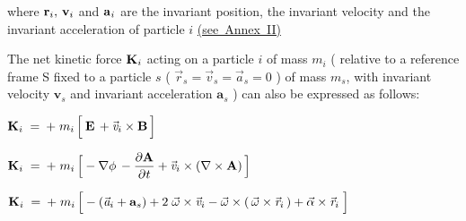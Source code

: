 \documentclass[10pt]{article}
\begin{document}
\vspace{+0.09em}

\par \bigskip \noindent where ${\mathbf{r}}_i, \hspace{+0.180em} {\mathbf{v}}_i$ and ${\mathbf{a}}_{\hspace{+0.045em}i}$ are the invariant position, the invariant velocity and the invariant \hbox {acceleration} of particle $i$ \hbox {\hyperlink{a1p2}{(\hspace{+0.09em}see Annex II\hspace{+0.120em})}}

\newpage

\par {}

\par {}

\par \bigskip \noindent The net kinetic force ${\mathbf{K}}_{\hspace{+0.009em}i}$ acting on a particle $i$ of mass $m_i$ ( relative to a reference frame S fixed to a particle $s$ ( ${\vec{\mathit{r}}}_{s} = {\vec{\mathit{v}}}_{s} = {\vec{\mathit{a}}}_{s} = 0$ ) of mass $m_s$, with invariant velocity ${\mathbf{v}}_s$ and invariant acceleration ${\mathbf{a}}_s$ ) can also be expressed as follows:

\par \bigskip ${\mathbf{K}}_{\hspace{+0.009em}i} \;=\: + \; m_i \, \Big[ \: {\mathbf{E}} \, + {\vec{\mathit{v}}}_{i} \times {\mathbf{B}} \, \Big]$

\par \bigskip ${\mathbf{K}}_{\hspace{+0.009em}i} \;=\: + \; m_i \, \Big[ - \nabla \phi \, - \dfrac{\partial{\mathbf{A}}}{\partial{\hspace{+0.03em}t}} + {\vec{\mathit{v}}}_{i} \times (\nabla \times {\mathbf{A}}) \, \Big]$

\par \bigskip ${\mathbf{K}}_{\hspace{+0.009em}i} \;=\: + \; m_i \, \Big[ - ({\vec{\mathit{a}}}_{i} + {\mathbf{a}}_s) + 2 \; {\vec{\omega}} \times {\vec{\mathit{v}}}_{i} - {\vec{\omega}} \times ( \, {\vec{\omega}} \times {\vec{\mathit{r}}}_{i} \, ) + {\vec{\alpha}} \times {\vec{\mathit{r}}}_{i} \; \Big]$
\end{document}
